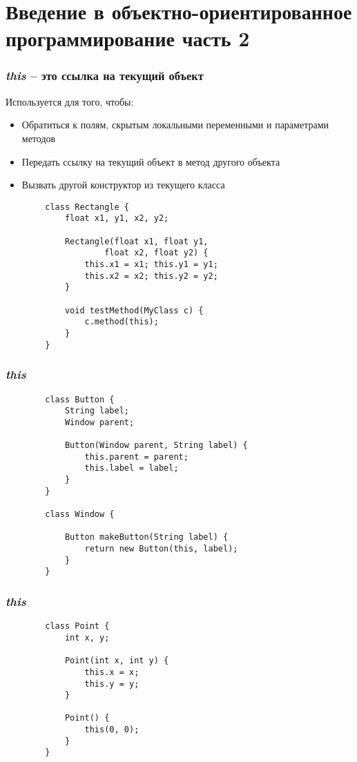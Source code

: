 \section{Введение в объектно-ориентированное программирование часть 2}

\begin{frame}[fragile]
	\frametitle{\textit{this} -- это ссылка на текущий объект}

	\begin{large}
	Используется для того, чтобы:
	\begin{itemize}
	\item{Обратиться к полям, скрытым локальными переменными и параметрами методов}
	\item{Передать ссылку на текущий объект в метод другого объекта}
	\item{Вызвать другой конструктор из текущего класса}
	\end{itemize}
	\end{large}

	\begin{verbatim}
		class Rectangle {
		    float x1, y1, x2, y2;

		    Rectangle(float x1, float y1,
		            float x2, float y2) {
		        this.x1 = x1; this.y1 = y1;
		        this.x2 = x2; this.y2 = y2;
		    }
		
		    void testMethod(MyClass c) {
		        c.method(this);
		    }
		}
	\end{verbatim}
\end{frame}

\begin{frame}[fragile]
	\frametitle{\textit{this}}

	\begin{verbatim}
		class Button {
		    String label;
		    Window parent;

		    Button(Window parent, String label) {
		        this.parent = parent;
		        this.label = label;
		    }
		}

		class Window {

		    Button makeButton(String label) {
		        return new Button(this, label);
		    }
		}
	\end{verbatim}
\end{frame}

\begin{frame}[fragile]
	\frametitle{\textit{this}}

	\begin{verbatim}
		class Point {
		    int x, y;

		    Point(int x, int y) {
		        this.x = x;
		        this.y = y;
		    }

		    Point() {
		        this(0, 0);
		    }
		}
	\end{verbatim}
\end{frame}

